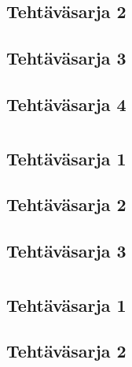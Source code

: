 	\section{Tehtäväsarja 2}
		
	\section{Tehtäväsarja 3}
		
	\section{Tehtäväsarja 4}
		
\chapter{}
	\section{Tehtäväsarja 1}
		
	\section{Tehtäväsarja 2}
		
	\section{Tehtäväsarja 3}
		
\chapter{}
	\section{Tehtäväsarja 1}
		
	\section{Tehtäväsarja 2}
		
